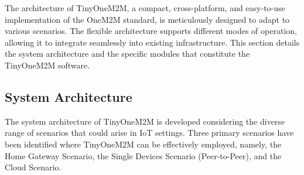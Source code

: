 \documentclass[a4paper,fleqn]{cas-dc}
\begin{document}
The architecture of TinyOneM2M, a compact, cross-platform, and easy-to-use implementation of the OneM2M standard, is meticulously designed to adapt to various scenarios. The flexible architecture supports different modes of operation, allowing it to integrate seamlessly into existing infrastructure. This section details the system architecture and the specific modules that constitute the TinyOneM2M software.

\subsection{System Architecture}

The system architecture of TinyOneM2M is developed considering the diverse range of scenarios that could arise in IoT settings. Three primary scenarios have been identified where TinyOneM2M can be effectively employed, namely, the Home Gateway Scenario, the Single Devices Scenario (Peer-to-Peer), and the Cloud Scenario.
\end{document}
